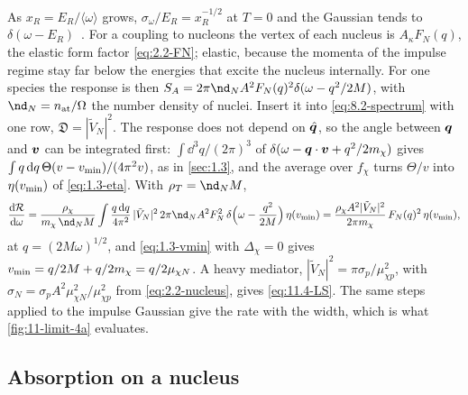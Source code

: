 As $x_R = E_R/\langle\omega\rangle$ grows, $\sigma_\omega/E_R = x_R^{-1/2}$ at $T = 0$ and the Gaussian tends to $\delta(\omega - E_R)$~\cite[Eq.~(42)]{campbelldeem2022dark}. For a coupling to nucleons the vertex of each nucleus is $A_\kappa F_N(q)$, the elastic form factor \cref{eq:2.2-FN}; elastic, because the momenta of the impulse regime stay far below the energies that excite the nucleus internally. For one species the response is then $S_A = 2\pi\nd_NA^2F_N(q)^2\delta(\omega - q^2/2M)$, with $\nd_N = n_{\mathrm{at}}/\Omega$ the number density of nuclei. Insert it into \cref{eq:8.2-spectrum} with one row, $\mathfrak{D} = |\tilde V_N|^2$. The response does not depend on $\hat{\bm{q}}$, so the angle between $\bm{q}$ and $\bm{v}$ can be integrated first: $\int\dd^3q/(2\pi)^3$ of $\delta(\omega - \bm{q}\cdot\bm{v} + q^2/2m_{\chi})$ gives $\int q\,\mathrm{d} q\,\Theta(v - v_{\mathrm{min}})/(4\pi^2v)$, as in \cref{sec:1.3}, and the average over $f_\chi$ turns $\Theta/v$ into $\eta(v_{\mathrm{min}})$ of \cref{eq:1.3-eta}. With $\rho_T = \nd_NM$,
\begin{equation*}
  \frac{\dd\mathcal{R}}{\dd\omega} = \frac{\rho_\chi}{\mchi\,\nd_NM}\int\frac{q\,\dd q}{4\pi^2}\,|\tilde V_N|^2\,2\pi\nd_NA^2F_N^2\,\delta\Bigl(\omega - \frac{q^2}{2M}\Bigr)\,\eta(\vmin)
  = \frac{\rho_\chi A^2|\tilde V_N|^2}{2\pi\mchi}\,F_N(q)^2\,\eta(\vmin) ,
\end{equation*}
at $q = (2M\omega)^{1/2}$, and \cref{eq:1.3-vmin} with $\Delta_\chi = 0$ gives $v_{\mathrm{min}} = q/2M + q/2m_{\chi} = q/2\mu_{\chi N}$. A heavy mediator, $|\tilde V_N|^2 = \pi\sigma_p/\mu_{\chi p}^2$, with $\sigma_N = \sigma_pA^2\mu_{\chi N}^2/\mu_{\chi p}^2$ from \cref{eq:2.2-nucleus}, gives \cref{eq:11.4-LS}. The same steps applied to the impulse Gaussian give the rate with the width, which is what \cref{fig:11-limit-4a} evaluates.

\subsection{Absorption on a nucleus}

